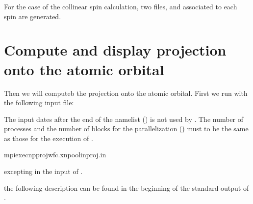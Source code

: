\documentclass[letterpaper,10pt,pdftex,openany,english]{sphinxmanual}
\begin{document}
\sphinxAtStartPar
For the case of the collinear spin calculation,
two files,  and  associated
to each spin are generated.


\section{Compute and display projection onto the atomic orbital}
\label{\detokenize{qe:compute-and-display-projection-onto-the-atomic-orbital}}
\sphinxAtStartPar
Then we will computeb the projection onto the atomic orbital.
First we run  with the following input file:

\sphinxAtStartPar
{}

\begin{sphinxVerbatim}[commandchars=\\\{\}]
     
 
\end{sphinxVerbatim}

\sphinxAtStartPar
The input dates after the end of the name\sphinxhyphen{}list  (\sphinxcode{\sphinxupquote{/}})
is not used by .
The number of processes and the number of blocks for
the \sphinxhyphen{}parallelization () must to be the same as those
for the execution of .

\begin{sphinxVerbatim}[commandchars=\\\{\}]
\PYGZdl{}mpiexec\PYGZhy{}npprojwfc.x\PYGZhy{}npool\PYGZhy{}inproj.in
\end{sphinxVerbatim}

\sphinxAtStartPar
excepting  in the input of .

\sphinxAtStartPar
the following description can be found
in the beginning of the standard output of .
\end{document}
